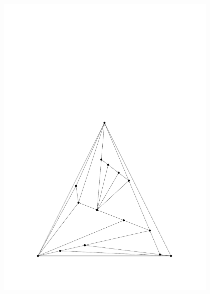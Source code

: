 \begin{figure}
\begin{minipage}{0.48\textwidth}
    \includegraphics[width=0.95\textwidth]{vis_15_1.pdf}
  \end{minipage}
    \hfill
    \vspace{5mm}
  \begin{minipage}{0.48\textwidth}
  \centering

\end{minipage}
\end{figure}

